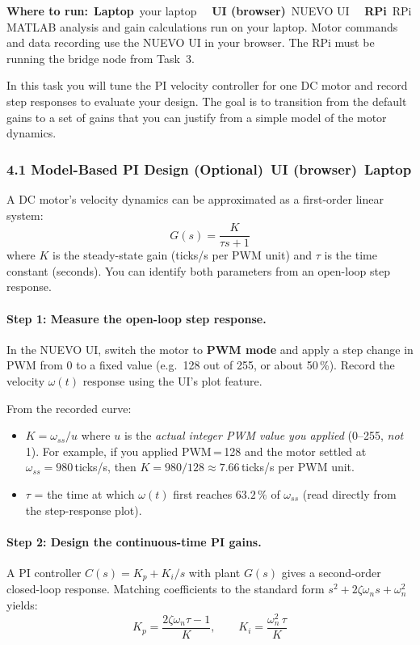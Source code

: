 \documentclass{ol-softwaremanual}
\newcommand{\onlaptop}{%
  \,\colorbox{green!25}{\footnotesize\sffamily\bfseries Laptop}}
\newcommand{\onrpi}{%
  \,\colorbox{blue!20}{\footnotesize\sffamily\bfseries RPi}}
\newcommand{\onui}{%
  \,\colorbox{yellow!50}{\footnotesize\sffamily\bfseries UI (browser)}}
\newcommand{\machinebox}[2]{%
  \par\noindent
  \colorbox{gray!12}{\parbox{\dimexpr\linewidth-2\fboxsep}{%
    \small\sffamily\textbf{Where to run:} #1 \quad\textbar\quad #2}}%
  \par\smallskip}
\begin{document}
\machinebox{\onlaptop\ your laptop \textbar\ \onui\ NUEVO UI \textbar\ \onrpi\ RPi}{MATLAB analysis and gain calculations run on your laptop. Motor commands and data recording use the NUEVO UI in your browser. The RPi must be running the bridge node from Task~3.}

In this task you will tune the PI velocity controller for one DC motor and record
step responses to evaluate your design.
The goal is to transition from the default gains to a set of gains that you can
justify from a simple model of the motor dynamics.

\subsubsection*{4.1 Model-Based PI Design (Optional)\onui\onlaptop}

A DC motor's velocity dynamics can be approximated as a first-order linear system:
\begin{equation}
  G(s) = \frac{K}{\tau s + 1}
  \label{eq:motor_model}
\end{equation}
where $K$ is the steady-state gain (ticks/s per PWM unit) and $\tau$ is the time
constant (seconds).
You can identify both parameters from an open-loop step response.

\paragraph{Step 1: Measure the open-loop step response.}
In the NUEVO UI, switch the motor to \textbf{PWM mode} and apply a step change in
PWM from 0 to a fixed value (e.g.\ 128 out of 255, or about 50\,\%).
Record the velocity $\omega(t)$ response using the UI's plot feature.

From the recorded curve:
\begin{itemize}
  \item $K = \omega_{ss} / u$ \quad where $u$ is the \emph{actual integer PWM value you
        applied} (0--255, \emph{not} 1).
        For example, if you applied PWM\,=\,128 and the motor settled at
        $\omega_{ss} = 980$\,ticks/s, then $K = 980/128 \approx 7.66$\,ticks/s per PWM
        unit.
  \item $\tau$ = the time at which $\omega(t)$ first reaches $63.2\,\%$ of $\omega_{ss}$
        (read directly from the step-response plot).
\end{itemize}

\paragraph{Step 2: Design the continuous-time PI gains.}
A PI controller $C(s) = K_p + K_i/s$ with plant $G(s)$ gives a second-order
closed-loop response.
Matching coefficients to the standard form $s^2 + 2\zeta\omega_n s + \omega_n^2$
yields:
\begin{equation}
  K_p = \frac{2\zeta\omega_n\tau - 1}{K}, \qquad
  K_i = \frac{\omega_n^2 \,\tau}{K}
  \label{eq:pi_gains}
\end{equation}
\end{document}
